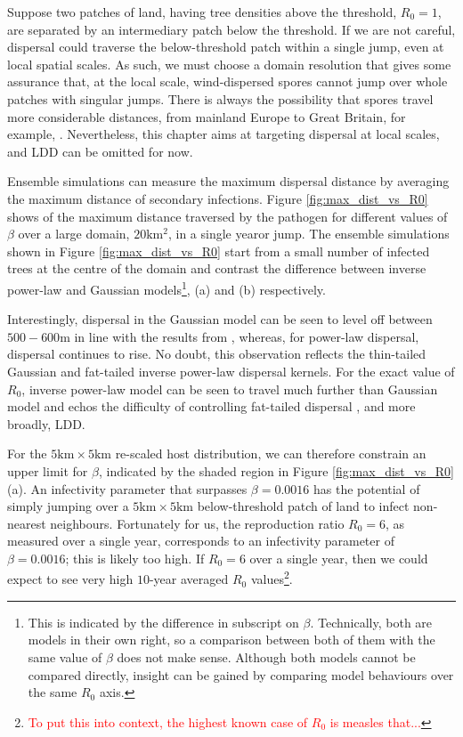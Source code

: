 Suppose two patches of land, having tree densities above the threshold, $R_0 = 1$, are separated by an intermediary patch below the threshold. If we are not careful, dispersal could traverse the below-threshold patch within a single jump, even at local spatial scales. As such, we must choose a domain resolution that gives some assurance that, at the local scale, wind-dispersed spores cannot jump over whole patches with singular jumps. There is always the possibility that spores travel more considerable distances, from mainland Europe to Great Britain, for example, \cite{freer2017tree, wylder2018evidence}. Nevertheless, this chapter aims at targeting dispersal at local scales, and LDD can be omitted for now.

Ensemble simulations can measure the maximum dispersal distance by averaging the maximum distance of secondary infections. Figure \ref{fig:max_dist_vs_R0} shows of the maximum distance traversed by the pathogen for different values of $\beta$ over a large domain, $20\mathrm{km^2}$, in a single year\textemdash or jump. The ensemble simulations shown in Figure \ref{fig:max_dist_vs_R0} start from a small number of infected trees at the centre of the domain and contrast the difference between inverse power-law and Gaussian models\footnote{This is indicated by the difference in subscript on $\beta$. Technically, both are models in their own right, so a comparison between both of them with the same value of $\beta$ does not make sense. Although both models cannot be compared directly, insight can be gained by comparing model behaviours over the same $R_0$ axis.}, (a) and (b) respectively. 

Interestingly, dispersal in the Gaussian model can be seen to level off between $500-600\mathrm{m}$ in line with the results from \cite{grosdidier2018tracking}, whereas, for power-law dispersal, dispersal continues to rise. No doubt, this observation reflects the thin-tailed Gaussian and fat-tailed inverse power-law dispersal kernels. For the exact value of $R_0$, inverse power-law model can be seen to travel much further than Gaussian model and echos the difficulty of controlling fat-tailed dispersal \cite{WEBIDEMICS}, and more broadly, LDD.

For the $5\mathrm{km} \times 5 \mathrm{km}$ re-scaled host distribution, we can therefore constrain an upper limit for $\beta$, indicated by the shaded region in Figure \ref{fig:max_dist_vs_R0} (a). An infectivity parameter that surpasses $\beta = 0.0016$ has the potential of simply jumping over a $5\mathrm{km} \times 5 \mathrm{km}$ below-threshold patch of land to infect non-nearest neighbours. Fortunately for us, the reproduction ratio $R_0=6$, as measured over a single year, corresponds to an infectivity parameter of $\beta = 0.0016$; this is likely too high. If $R_0=6$ over a single year, then we could expect to see very high $10$-year averaged $R_0$ values\footnote{\textcolor{red}{To put this into context, the highest known case of $R_0$ is measles that...}}.


